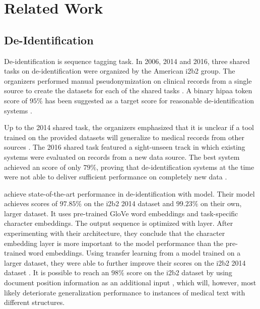
\section{Related Work}\label{sec:related}

\subsection{De-Identification}
De-identification is  sequence tagging task.
%
In 2006, 2014 and 2016, three shared tasks on de-identification were organized by the American i2b2 group.
%
The organizers performed manual pseudonymization on clinical records from a single source to create the datasets for each of the shared tasks \citep{stubbs2015annotating}.
%
A binary \ac{hipaa} token \fone score of $95\%$ has been suggested as a target score for reasonable de-identification systems \citep{stubbs2015automated}.

%
Up to the 2014 shared task, the organizers emphasized that it is unclear if a tool trained on the provided datasets will generalize to medical records from other sources \citep{uzuner2007evaluating,stubbs2015automated}.
%
The 2016 shared task featured a sight-unseen track in which existing systems were evaluated on records from a new data source.
%
The best system achieved an \fone score of only $79\%$, proving that de-identification systems at the time were not able to deliver sufficient performance on completely new data \citep{stubbs2017identification}.

%
\citet{dernoncourt2017identification} achieve state-of-the-art performance in de-identification with  model.
%
Their model achieves \fone scores of $97.85\%$ on the i2b2 2014 dataset and $99.23\%$ on their own, larger dataset.
%
It uses pre-trained GloVe word embeddings and task-specific character embeddings.
%
The output sequence is optimized with  layer.
%
After experimenting with their architecture, they conclude that the character embedding layer is more important to the model performance than the pre-trained word embeddings.
%
Using transfer learning from a model trained on a larger dataset, they were able to further improve their scores on the i2b2 2014 dataset \citep{lee2017transfer}.
%
It is possible to reach an $98\%$ \fone score on the i2b2 dataset by using document position information as an additional input \citep{zhao2018leveraging}, which will, however, most likely deteriorate generalization performance to instances of medical text with different structures.

